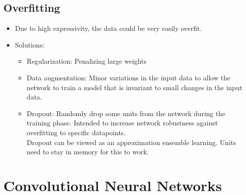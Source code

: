 \documentclass[parskip=half]{scrartcl}
\begin{document}

    \subsection{Overfitting} %
    \label{sub:overfitting}

    \begin{itemize}
        \item 
        Due to high expressivity, the data could be very easily overfit.
        \item 
        Solutions:
        \begin{itemize}
            \item 
            Regularization: Penalizing large weights
            \item 
            Data augmentation: Minor variations in the input data to allow the network to train a model that is invariant to small changes in the input data.
            \item 
            Dropout: Randomly drop some units from the network during the training phase. Intended to increase network robustness against overfitting to specific datapoints.\\
            Dropout can be viewed as an approximation ensemble learning. Units need to stay in memory for this to work.
        \end{itemize}
    \end{itemize}
    
    



\section{Convolutional Neural Networks} %
\label{sec:convolutional_neural_networks}
\end{document}

